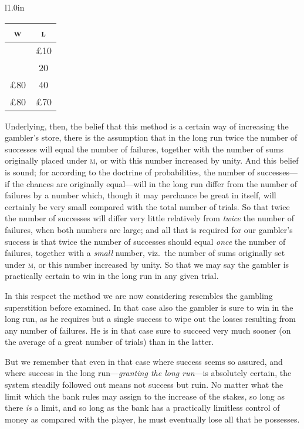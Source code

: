 \documentclass[letterpaper,12pt,oneside,openany]{memoir}
\begin{document}
\begin{wrapfigure}[7]{l}{1.0in}
\begin{tabular}{|c|c|}
  \hline
  \textsc{w} & \textsc{l} \\
  \hline
  \,         & \pounds 10 \\
  \,         & 20         \\
  \pounds 80 & 40         \\
  \hline
  \pounds 80 & \pounds 70 \\
  \hline
\end{tabular}
\end{wrapfigure}
Underlying, then, the belief that this method is
a certain way of increasing the gambler's store, there
is the assumption that in the long run twice the number
of successes will equal the number of failures, together
with the number of sums originally placed under
\textsc{m}, or with this number increased by unity. And this
belief is sound; for according to the doctrine of probabilities,
the number of successes---if the chances are
originally equal---will in the long run differ from the
number of failures by a number which, though it may
perchance be great in itself, will certainly be very small
compared with the total number of trials. So that
twice the number of successes will differ very little
relatively from \emph{twice} the number of failures, when both
numbers are large; and all that is required for our
gambler's success is that twice the number of successes
should equal \emph{once} the number of failures, together with
a \emph{small} number, viz.\ the number of sums originally set
under \textsc{m}, or this number increased by unity. So that
we may say the gambler is practically certain to win in
the long run in any given trial.

In this respect the method we are now considering
resembles the gambling superstition before examined.
In that case also the gambler is sure to win in the long
run, as he requires but a single success to wipe out the
losses resulting from any number of failures. He is in
that case sure to succeed very much sooner (on the
average of a great number of trials) than in the latter.

But we remember that even in that case where
success seems so assured, and where success in the long
run---\textit{granting the long run}---is absolutely certain, the
system steadily followed out means not success but ruin.
No matter what the limit which the bank rules may
assign to the increase of the stakes, so long as there \emph{is}
a limit, and so long as the bank has a practically limitless
control of money as compared with the player, he
must eventually lose all that he possesses.
\end{document}
